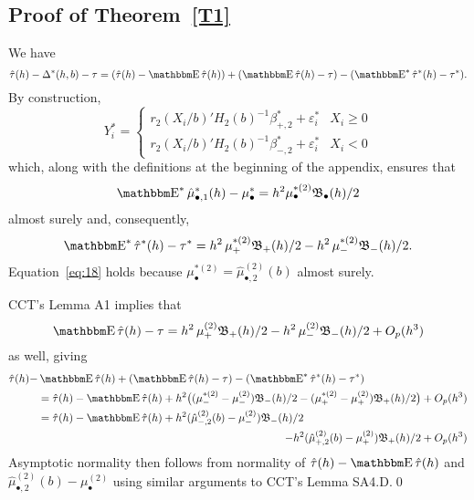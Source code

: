 \documentclass[12pt,fleqn]{article}
\begin{document}
\subsection{Proof of Theorem~\ref{T1}}
We have
\begin{equation*}
  \hat\tau(h) - \Delta^*(h,b) - \tau = (\hat\tau(h) - \E \hat \tau(h)) +
  (\E \hat \tau(h) - \tau) - (\E^* \hat \tau^*(h) - \tau^*).
\end{equation*}
By construction,
\begin{equation*}
  Y_i^* =
  \begin{cases}
    r_2(X_i/b)'H_2(b)^{-1} \beta_{+,2}^* + \varepsilon_i^* & X_i \geq 0 \\
    r_2(X_i/b)'H_2(b)^{-1} \beta_{-,2}^* + \varepsilon_i^* & X_i < 0
  \end{cases}
\end{equation*}
which, along with the definitions at the beginning of the appendix,
ensures that
\begin{align*}
  \E^* \hat\mu_{\bullet,1}^*(h) - \mu_{\bullet}^{*}
  = h^{2} \mu_{\bullet}^{*(2)} \Bf_{\bullet}(h)/2
\end{align*}
almost surely and, consequently,
\begin{equation*}
  \E^* \hat\tau^*(h) - \tau^{*} = h^2\, \mu_+^{*(2)} \Bf_+(h)/2
  - h^2\, \mu_{-}^{*(2)} \Bf_{-}(h)/2.
\end{equation*}
Equation~\eqref{eq:18} holds because
$\mu_\bullet^{*(2)} = \hat\mu_{\bullet,2}^{(2)}(b)$ almost surely.

CCT's Lemma A1 implies that
\begin{equation*}
  \E \hat\tau(h) - \tau = h^2\, \mu_+^{(2)} \Bf_+(h)/2
  - h^2\, \mu_{-}^{(2)} \Bf_{-}(h)/2 + O_p(h^3)
\end{equation*}
as well, giving
\begin{align}
  \hat\tau(h) - & \E \hat\tau(h) + (\E \hat\tau(h) - \tau) - (\E^* \hat\tau^*(h) - \tau^*)\notag \\
  &= \hat\tau(h) - \E\hat\tau(h)
   + h^2 \big((\mu_{-}^{*(2)} - \mu_{-}^{(2)}) \Bf_{-}(h) /2
   - (\mu_+^{*(2)}-\mu_+^{(2)}) \Bf_{+}(h) / 2 \big) + O_p(h^{3}) \notag \\
  \label{eq:6}
  &= \hat\tau(h) - \E\hat\tau(h)
   + h^2 (\hat\mu_{-,2}^{(2)}(b) - \mu_-^{(2)}) \Bf_{-}(h) /2 \\
  \notag
  &\pushright{- h^2 (\hat\mu_{+,2}^{(2)}(b) - \mu_+^{(2)}) \Bf_{+}(h) / 2
   + O_p(h^{3})}
\end{align}
Asymptotic
normality then follows from normality of $\hat\tau(h) - \E\hat\tau(h)$ and
$\hat\mu_{\bullet,2}^{(2)}(b) - \mu_\bullet^{(2)}$ using similar arguments to
CCT's Lemma SA4.D.\qed
\end{document}
